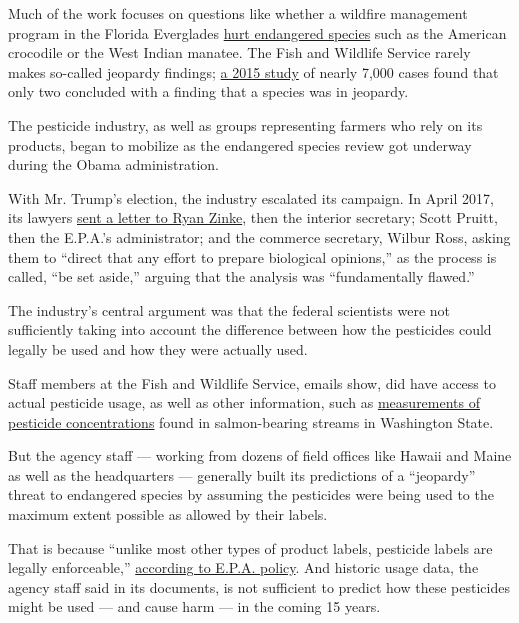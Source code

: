 Much of the work focuses on questions like whether a wildfire management
program in the Florida Everglades
\href{https://ecos.fws.gov/tails/pub/document/2303919}{hurt endangered
species} such as the American crocodile or the West Indian manatee. The
Fish and Wildlife Service rarely makes so-called jeopardy findings;
\href{https://www.pnas.org/content/112/52/15844}{a 2015 study} of nearly
7,000 cases found that only two concluded with a finding that a species
was in jeopardy.

The pesticide industry, as well as groups representing farmers who rely
on its products, began to mobilize as the endangered species review got
underway during the Obama administration.

With Mr. Trump's election, the industry escalated its campaign. In April
2017, its lawyers
\href{https://www.documentcloud.org/documents/5778894-Trump-Era-Shift-Evaluating-Pesticide-Threats-to.html\#document/p21/a488251}{sent
a letter to Ryan Zinke}, then the interior secretary; Scott Pruitt, then
the E.P.A.'s administrator; and the commerce secretary, Wilbur Ross,
asking them to ``direct that any effort to prepare biological
opinions,'' as the process is called, ``be set aside,'' arguing that the
analysis was ``fundamentally flawed.''

The industry's central argument was that the federal scientists were not
sufficiently taking into account the difference between how the
pesticides could legally be used and how they were actually used.

Staff members at the Fish and Wildlife Service, emails show, did have
access to actual pesticide usage, as well as other information, such as
\href{https://www.documentcloud.org/documents/5779584-2017-05-30-1355-Email-Ambient-Monitoring-for.html}{measurements
of pesticide concentrations} found in salmon-bearing streams in
Washington State.

But the agency staff --- working from dozens of field offices like
Hawaii and Maine as well as the headquarters --- generally built its
predictions of a ``jeopardy'' threat to endangered species by assuming
the pesticides were being used to the maximum extent possible as allowed
by their labels.

That is because ``unlike most other types of product labels, pesticide
labels are legally enforceable,''
\href{https://www.epa.gov/pesticide-labels/introduction-pesticide-labels}{according
to E.P.A. policy}. And historic usage data, the agency staff said in its
documents, is not sufficient to predict how these pesticides might be
used --- and cause harm --- in the coming 15 years.

